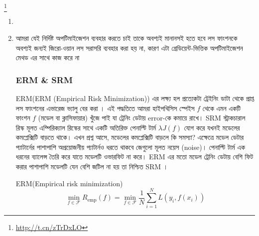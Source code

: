 \documentclass[graybox, envcountchap, twocolumn]{styles/svmult}
\begin{document}
 \footnote{\url{http://t.cn/zTrDxLO}}


\begin{enumerate}
\item {}


\item {\bengalifont আমরা যেই নির্দিষ্ট অপটিমাইজেশন ব্যবহার করতে চাই তাকে অবশ্যই মানানসই হতে হবে লস ফাংশনকে অবশ্যই জন্যই জিরো-ওয়ান লস সরাসরি ব্যবহার করা হয় না, কারণ এটা গ্রেডিয়েন্ট-ভিত্তিক অপটিমাইজেশন মেথড এর সাথে কাজ করে না}







\subsubsection{ERM & SRM}
\bengalifont
ERM(ERM (Empirical Risk Minimization)) এর লক্ষ্য হল প্রত্যেকটা ট্রেইনিং ডাটা থেকে প্রাপ্ত লস ফাংশনের এভারেজ ভ্যালু বের করা । এই পদ্ধতিতে আমরা হাইপথিসিস স্পেইস $𝑓$ থেকে এমন একটি ফাংশন $f$ (মডেল বা ক্লাসিফায়ার) খুঁজে পাই যা ট্রেনিং ডেটায় error-কে কমায়ে রাখে। 
\newline
SRM স্ট্রাকচারাল রিস্ক মূলত এম্পিরিক্যাল রিস্কের সাথে একটি অতিরিক্ত পেনাল্টি টার্ম $\lambda J(f)$ যোগ করে যখনই মডেলের কমপ্লেক্সিটি বাড়তে থাকে। এখন প্রশ্ন আসে, মডেলের কমপ্লেক্সিটি বাড়লে কি সমস্যা? এক্ষেত্রে মডেল ডেটার প্যাটার্নের পাশাপাশি অপ্রয়োজনীয় প্যাটার্নও ধরতে থাকবে জেগুলো মূলত নয়েস (noise)। পেনাল্টি টার্ম এক ধরনের ব্যালেন্স তৈরি করে যাতে মডেলটি ওভারফিট না করে। ERM এর মতো মডেল ট্রেনিং ডেটায় বেশি ফিট করার পাশাপাশি মডেলটি যেন বেশি জটিল না হয় তা নিশ্চিত SRM । 
\begin{definition}


ERM(Empirical risk minimization)
\begin{equation} %
\min\limits _{f \in \mathcal{F}} R_{\mathrm{emp}}(f)=\min\limits _{f \in \mathcal{F}} \dfrac{1}{N}\sum\limits_{i=1}^{N} L\left(y_i,f(x_i)\right)
\end{equation}


\end{definition}
\end{enumerate}
\end{document}
